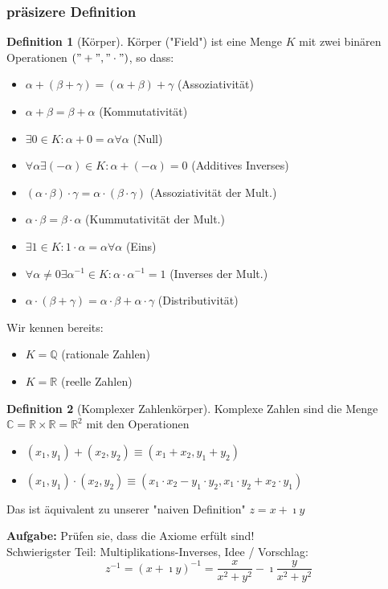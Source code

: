\documentclass[a4paper]{scrartcl}
\DeclareMathOperator{\Exists}{\exists}
\DeclareMathOperator{\Forall}{\forall}
\theoremstyle{definition}
\newtheorem{defn}{Definition}
\theoremstyle{plain}
\theoremstyle{remark}
\newcommand{\I}{\ensuremath{\imath}}%
\begin{document}
\subsubsection{präsizere Definition}
\label{sec-5-1-3}
\begin{defn}[Körper]
Körper ("Field") ist eine Menge $K$ mit zwei binären Operationen $("+","\cdot")$, so dass:
\begin{itemize}
\item $\alpha + (\beta + \gamma) = (\alpha + \beta) + \gamma$ \hfill (Assoziativität)
\item $\alpha + \beta = \beta + \alpha$ \hfill (Kommutativität)
\item $\Exists 0 \in K: \alpha + 0 = \alpha \Forall \alpha$ \hfill (Null)
\item $\Forall \alpha \Exists (-\alpha) \in K: \alpha + (-\alpha) = 0$ \hfill (Additives Inverses)
\item $(\alpha \cdot \beta) \cdot \gamma = \alpha \cdot (\beta \cdot \gamma)$ \hfill (Assoziativität der Mult.)
\item $\alpha \cdot \beta = \beta \cdot \alpha$ \hfill (Kummutativität der Mult.)
\item $\Exists 1 \in K: 1\cdot \alpha = \alpha \Forall \alpha$ \hfill (Eins)
\item $\Forall \alpha \neq 0 \Exists \alpha^{-1} \in K: \alpha \cdot \alpha^{-1} = 1$ \hfill (Inverses der Mult.)
\item $\alpha\cdot (\beta + \gamma) = \alpha \cdot \beta + \alpha \cdot \gamma$ \hfill (Distributivität)
\end{itemize}
\end{defn}
Wir kennen bereits:
\begin{itemize}
\item $K = \mathbb{Q}$ \hfill (rationale Zahlen)
\item $K = \mathbb{R}$ \hfill (reelle Zahlen)
\end{itemize}
\begin{defn}[Komplexer Zahlenkörper]
Komplexe Zahlen sind die Menge $\mathbb{C} = \mathbb{R} \times \mathbb{R} = \mathbb{R}^2$ mit den Operationen
\begin{itemize}
\item $(x_1, y_1) + (x_2, y_2) \equiv (x_1 + x_2, y_1 + y_2)$
\item $(x_1, y_1) \cdot (x_2, y_2) \equiv (x_1 \cdot x_2 - y_1 \cdot y_2, x_1 \cdot y_2 + x_2 \cdot y_1)$
\end{itemize}
Das ist äquivalent zu unserer "naiven Definition" $z = x + \I y$
\end{defn}
\textbf{Aufgabe:} Prüfen sie, dass die Axiome erfült sind! \\
    Schwierigster Teil: Multiplikations-Inverses, Idee / Vorschlag:
\[z^{-1} = (x + \I y)^{-1} = \frac{x}{x^2 + y^2} - \I \frac{y}{x^2 + y^2}\]
\end{document}
